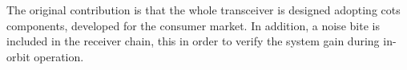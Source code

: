 \documentclass[conference,10pt,a4paper]{IEEEtran}%
\begin{document}
The original contribution is that the whole transceiver is designed adopting \ac{cots} components, developed for the consumer market.
In addition, a noise \ac{bite} is included in the receiver chain, this in order to verify the system gain during in-orbit operation.
\end{document}

